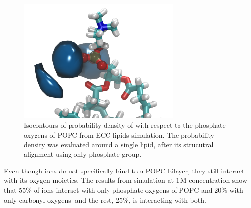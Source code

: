 \documentclass[aip,jcp,twocolumn]{revtex4}
\begin{document}
\begin{figure}[tb!]
  \centering
  \includegraphics[width=8.0cm]{../Fig/volmap_resid10_Ca_Cl_PO4Cent.png} %
  \caption{\label{fig:volmaps}
      Isocontours of probability density of  with respect to 
      the phosphate oxygens of POPC from ECC-lipids simulation.
      The probability density was evaluated around a single lipid, 
      after its strucutral alignment using only phosphate group. 
  }
\end{figure}

Even though  ions do not specifically bind to a POPC bilayer,
they still interact with its oxygen moieties. 
The results  from simulation at $1\,$M  concentration show 
that 55\% of  ions interact with only phosphate oxygens of POPC 
and 20\% with only carbonyl oxygens,
and the rest, 25\%, is interacting with both.
\end{document}
